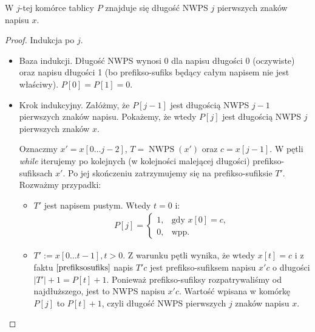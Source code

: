\begin{theorem}
	\label{thrm:computeP}
	W $j$-tej komórce tablicy $P$ znajduje się długość NWPS $j$ pierwszych znaków napisu $x$.
	\begin{proof}
		Indukcja po $j$.
		\begin{itemize}
			\item Baza indukcji. Długość NWPS wynosi 0 dla napisu długości 0 (oczywiste) oraz napisu długości 1 (bo prefikso-sufiks będący całym napisem nie jest właściwy). $P[0]=P[1]=0$.
			\item Krok indukcyjny. Załóżmy, że $P[j-1]$ jest długością NWPS $j-1$ pierwszych znaków napisu. Pokażemy, że wtedy $P[j]$ jest długością NWPS $j$ pierwszych znaków $x$.
			
			Oznaczmy $x' = x[0\dots j-2]$, $T = \operatorname{NWPS}(x')$ oraz $c = x[j-1]$. W pętli \textit{while} iterujemy po kolejnych (w kolejności malejącej długości) prefikso-sufiksach $x'$. Po jej skończeniu zatrzymujemy się na prefikso-sufiksie $T'$. Rozważmy przypadki:
			\begin{itemize}
				\item $T'$ jest napisem pustym. Wtedy $t=0$ i:
				\begin{gather*}
					P[j] = 
					\begin{cases}
						1, & \text{gdy } x[0]=c, \\
						0, & \text{wpp}.
					\end{cases}
				\end{gather*}
				\item $T':=x[0 \dots t-1], t > 0$. Z warunku pętli wynika, że wtedy $x[t]=c$ i z faktu $\ref{prefiksosufiks}$ napis $T'c$ jest prefikso-sufiksem napisu $x'c$ o długości $|T'|+1=P[t]+1$. Ponieważ prefikso-sufiksy rozpatrywaliśmy od najdłuższego, jest to NWPS napisu $x'c$. Wartość wpisana w komórkę $P[j]$ to $P[t]+1$, czyli długość NWPS pierwszych $j$ znaków napisu $x$. \qedhere
			\end{itemize}		 
		\end{itemize}
	\end{proof}
\end{theorem}

